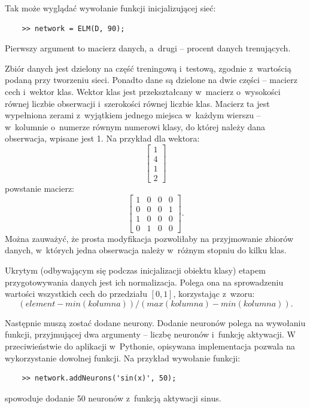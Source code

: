\documentclass[pl]{minipw} %
\begin{document}
Tak może wyglądać wywołanie funkcji inicjalizującej sieć:
\begin{lstlisting}
	>> network = ELM(D, 90);
\end{lstlisting}
Pierwszy argument to macierz danych, a~drugi -- procent danych trenujących.

Zbiór danych jest dzielony na część treningową i~testową, zgodnie z~wartością podaną przy tworzeniu sieci. 
Ponadto dane są dzielone na dwie części -- macierz cech i~wektor klas.
Wektor klas jest przekształcany w~macierz o~wysokości równej liczbie obserwacji i~szerokości równej liczbie klas.
Macierz ta jest wypełniona zerami z~wyjątkiem jednego miejsca w~każdym wierszu -- w~kolumnie o~numerze równym numerowi klasy, do której należy dana obserwacja, wpisane jest 1.
Na przykład dla wektora:
\[ \begin{bmatrix} 1 \\ 4 \\ 1 \\ 2 \end{bmatrix}\]
powstanie macierz:
\[ \begin{bmatrix} 1&0&0&0 \\ 0&0&0&1 \\ 1&0&0&0 \\ 0&1&0&0 \end{bmatrix}.\]
Można zauważyć, że prosta modyfikacja pozwoliłaby na przyjmowanie zbiorów danych, w~których jedna obserwacja należy w~różnym stopniu do kilku klas.

Ukrytym (odbywającym się podczas inicjalizacji obiektu klasy) etapem przygotowywania danych jest ich normalizacja. 
Polega ona na sprowadzeniu wartości wszystkich cech do przedziału $[0, 1]$, korzystając z~wzoru:
\[(element - min(kolumna))/(max(kolumna) - min(kolumna)).\]

Następnie muszą zostać dodane neurony.
Dodanie neuronów polega na wywołaniu funkcji, przyjmującej dwa argumenty -- liczbę neuronów i~funkcję aktywacji.
W przeciwieństwie do aplikacji w~Pythonie, opisywana implementacja pozwala na wykorzystanie dowolnej funkcji.
Na przykład wywołanie funkcji:
\begin{lstlisting}
	>> network.addNeurons('sin(x)', 50);
\end{lstlisting}
spowoduje dodanie 50 neuronów z~funkcją aktywacji sinus.
\end{document}
